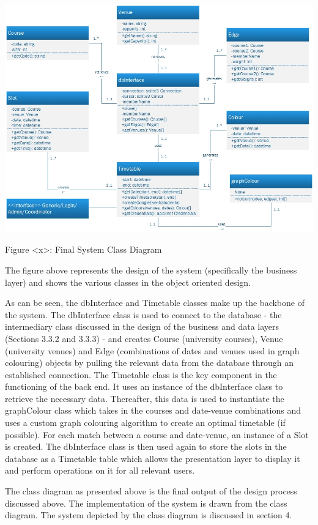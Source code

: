 \documentclass{article}
\begin{document}
\centerline{\includegraphics[scale=0.65]{ClassDiagram}}
Figure <x>: Final System Class Diagram

The figure above represents the design of the system (specifically the business layer) and shows the various classes in the object oriented design.

As can be seen, the dbInterface and Timetable classes make up the backbone of the system. The dbInterface class is used to connect to the database - the intermediary class discussed in the design of the business and data layers (Sections 3.3.2 and 3.3.3) - and creates Course (university courses), Venue (university venues) and Edge (combinations of dates and venues used in graph colouring) objects by pulling the relevant data from the database through an established connection. The Timetable class is the key component in the functioning of the back end. It uses an instance of the dbInterface class to retrieve the necessary data. Thereafter, this data is used to instantiate the graphColour class which takes in the courses and date-venue combinations and uses a custom graph colouring algorithm to create an optimal timetable (if possible). For each match between a course and date-venue, an instance of a Slot is created. The dbInterface class is then used again to store the slots in the database as a Timetable table which allows the presentation layer to display it and perform operations on it for all relevant users.

The class diagram as presented above is the final output of the design process discussed above. The
implementation of the system is drawn from the class diagram. The system depicted by the class diagram
is discussed in section 4.
\end{document}
